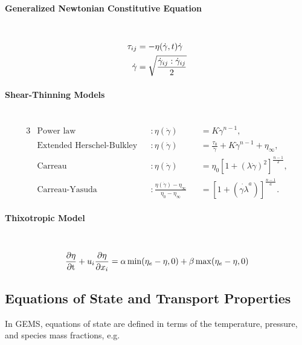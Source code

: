 \paragraph{Generalized Newtonian Constitutive Equation} ~\\

\begin{align}
	\tau_{i j} &= -\eta(\dot{\gamma}, t) \dot{\gamma} \\
	\dot{\gamma} &= \sqrt{\frac{\dot{\gamma}_{i j}: \dot{\gamma}_{i j}}{2}}
\end{align}

\paragraph{Shear-Thinning Models} ~\\

\begin{alignat}{3}
    &\text{Power law} &&: \eta(\dot{\gamma}) &&= K \dot{\gamma}^{n-1}, \\
    &\text{Extended Herschel-Bulkley} &&: \eta(\dot{\gamma}) &&= \frac{\tau_0}{\dot{\gamma}} + K \dot{\gamma}^{n-1} + \eta_{\infty}, \\
	&\text{Carreau} &&: \eta(\dot{\gamma}) &&= \eta_0 \left[ 1 + (\lambda \dot{\gamma})^2 \right]^{\frac{n-1}{2}}, \\
	&\text{Carreau-Yasuda} &&: \frac{\eta(\dot{\gamma}) - \eta_\infty}{\eta_0 - \eta_\infty} &&= \left[1 + (\dot{\gamma \lambda}^a)\right]^{\frac{n-1}{a}}.
\end{alignat}

\paragraph{Thixotropic Model} ~\\

\begin{equation}
	\frac{\partial \eta}{\partial \text{t}} + u_{i} \frac{\partial \eta}{\partial x_{i}} = \alpha \min (\eta_e - \eta, 0) + \beta \max (\eta_e - \eta, 0)
\end{equation}

\subsection{Equations of State and Transport Properties}

In GEMS, equations of state are defined in terms of the temperature, pressure, and species mass fractions, e.g.

